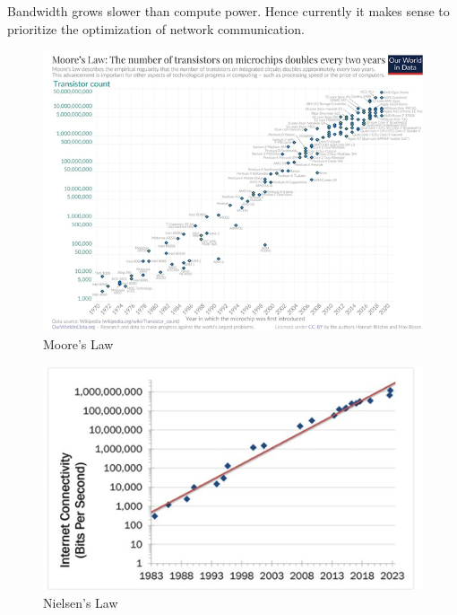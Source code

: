 \documentclass[../Main.tex]{subfiles}
\begin{document}
Bandwidth grows slower than compute power. Hence currently it makes sense
to prioritize the optimization of network communication.


\begin{figure}[H]
    \centering
    \includegraphics[width=0.5\linewidth]{Images/moore-law.png}
    \caption{Moore's Law}
\end{figure}

\begin{figure}[H]
    \centering
    \includegraphics[width=0.5\linewidth]{Images/nielsen-law.png}
    \caption{Nielsen's Law}
\end{figure}
\end{document}
